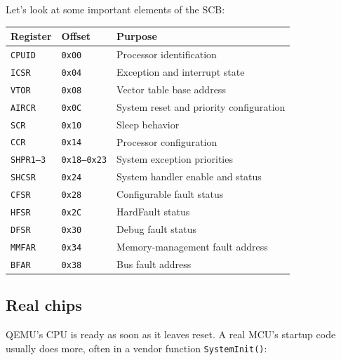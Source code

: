 \documentclass[a4paper,11pt]{article}
\begin{document}
Let's look at some important elements of the SCB:
\begin{table}[H]
	\centering
	\begin{tabular}{lll}
		\hline
		Register          & Offset              & Purpose                                 \\
		\hline
		\texttt{CPUID}    & \texttt{0x00}       & Processor identification                \\
		\texttt{ICSR}     & \texttt{0x04}       & Exception and interrupt state           \\
		\texttt{VTOR}     & \texttt{0x08}       & Vector table base address               \\
		\texttt{AIRCR}    & \texttt{0x0C}       & System reset and priority configuration \\
		\texttt{SCR}      & \texttt{0x10}       & Sleep behavior                          \\
		\texttt{CCR}      & \texttt{0x14}       & Processor configuration                 \\
		\texttt{SHPR1--3} & \texttt{0x18--0x23} & System exception priorities             \\
		\texttt{SHCSR}    & \texttt{0x24}       & System handler enable and status        \\
		\texttt{CFSR}     & \texttt{0x28}       & Configurable fault status               \\
		\texttt{HFSR}     & \texttt{0x2C}       & HardFault status                        \\
		\texttt{DFSR}     & \texttt{0x30}       & Debug fault status                      \\
		\texttt{MMFAR}    & \texttt{0x34}       & Memory-management fault address         \\
		\texttt{BFAR}     & \texttt{0x38}       & Bus fault address                       \\
		\hline
	\end{tabular}
\end{table}

\subsection{Real chips}

QEMU's CPU is ready as soon as it leaves reset. A real MCU's startup
code usually does more, often in a vendor function \texttt{SystemInit()}:
\end{document}
